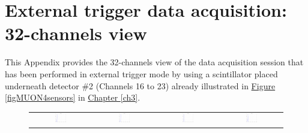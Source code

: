 \chapter[External trigger data acquisition: 32-channels view]{External trigger data acquisition: 32-channels view} \label{appendix32CHmuons}

This Appendix provides the 32-channels view of the data acquisition session that has been performed in external trigger mode by using a scintillator placed underneath detector \#2 (Channels 16 to 23) already illustrated in \hyperref[figMUON4sensors]{Figure \ref{figMUON4sensors}} in \hyperref[ch3]{Chapter \ref{ch3}}.

\begin{figure}[hbt!]
    \centering
    \begin{tabular}{cccc}
        \includegraphics[width=0.204\textwidth]{Images/chap3/results/muons/ch_ext_trigger/incoming_energy_32channels_34_2hr_0.pdf} & \includegraphics[width=0.204\textwidth]{Images/chap3/results/muons/ch_ext_trigger/incoming_energy_32channels_34_2hr_1.pdf} & \includegraphics[width=0.204\textwidth]{Images/chap3/results/muons/ch_ext_trigger/incoming_energy_32channels_34_2hr_2.pdf} & \includegraphics[width=0.204\textwidth]{Images/chap3/results/muons/ch_ext_trigger/incoming_energy_32channels_34_2hr_3.pdf}\\

\end{tabular}
\end{figure}
